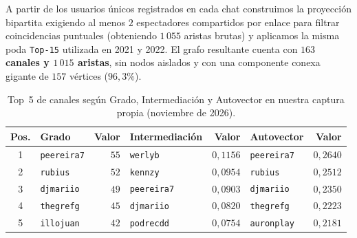 \documentclass[11pt,a4paper]{article}
\begin{document}
A partir de los usuarios únicos registrados en cada chat construimos la proyección bipartita exigiendo al menos $2$ espectadores compartidos por enlace para filtrar coincidencias puntuales (obteniendo $1\,055$ aristas brutas) y aplicamos la misma poda \texttt{Top-15} utilizada en 2021 y 2022. El grafo resultante cuenta con \textbf{$163$ canales y $1\,015$ aristas}, sin nodos aislados y con una componente conexa gigante de $157$ vértices ($96,3\%$).

\begin{table}[H]
\centering
\caption{Top~5 de canales según Grado, Intermediación y Autovector en nuestra captura propia (noviembre de 2026).}
\label{tab:top_2026}
\small
\begin{tabular}{@{}clrlrlr@{}}
\toprule
\textbf{Pos.} & \textbf{Grado} & \textbf{Valor} & \textbf{Intermediación} & \textbf{Valor} & \textbf{Autovector} & \textbf{Valor} \\
\midrule
1 & \texttt{peereira7} & $55$ & \texttt{werlyb} & $0,1156$ & \texttt{peereira7} & $0,2640$ \\
2 & \texttt{rubius} & $52$ & \texttt{kennzy} & $0,0954$ & \texttt{rubius} & $0,2512$ \\
3 & \texttt{djmariio} & $49$ & \texttt{peereira7} & $0,0903$ & \texttt{djmariio} & $0,2350$ \\
4 & \texttt{thegrefg} & $45$ & \texttt{djmariio} & $0,0820$ & \texttt{thegrefg} & $0,2223$ \\
5 & \texttt{illojuan} & $42$ & \texttt{podrecdd} & $0,0754$ & \texttt{auronplay} & $0,2181$ \\
\bottomrule
\end{tabular}
\end{table}
\end{document}
